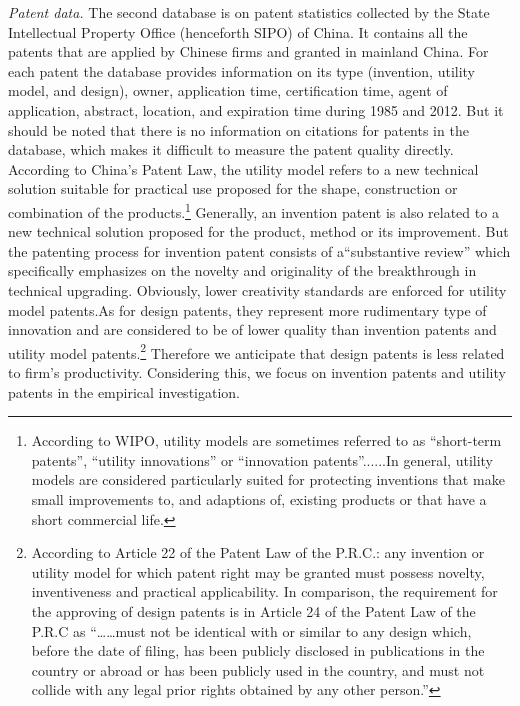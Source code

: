 \documentclass[11pt]{article}
\begin{document}
\textit{Patent data.} The second database is on patent statistics collected by the State Intellectual Property Office (henceforth SIPO) of China. It contains
all the patents that are applied by Chinese firms and granted in mainland China. For each patent the database provides information on its type (invention, utility model, and design), owner, application time, certification time, agent of application, abstract, location, and expiration time during 1985 and 2012. But it should be noted that there is no information on citations for patents in the database,
which makes it difficult to measure the patent quality directly. According to China's Patent Law, the utility model refers to a new technical solution suitable for practical use proposed for the shape, construction or combination of the products.\footnote{According to WIPO, utility models are sometimes referred to as ``short-term patents'', ``utility innovations'' or ``innovation patents''......In general, utility models are considered particularly suited for protecting inventions that make small improvements to, and adaptions of, existing products or that have a short commercial life.}  Generally, an invention patent is also related to a new technical solution proposed for the product, method or its improvement. But the patenting process for invention patent consists of a``substantive review'' which specifically emphasizes on the novelty and originality of the breakthrough in technical upgrading. Obviously, lower creativity standards are enforced for utility model patents.As for design patents, they represent more rudimentary type of innovation and are considered to be of lower quality than invention patents and utility model patents.\footnote{ According to Article 22 of the Patent Law of the P.R.C.: any invention
or utility model for which patent right may be granted must possess
novelty, inventiveness and practical applicability. In comparison,
the requirement for the approving of design patents is in Article
24 of the Patent Law of the P.R.C as \textquotedblleft \dots \dots must
not be identical with or similar to any design which, before the date
of filing, has been publicly disclosed in publications in the country
or abroad or has been publicly used in the country, and must not collide
with any legal prior rights obtained by any other person.\textquotedblright{}}
 Therefore we anticipate that design patents is less related to firm's productivity. Considering this, we focus on invention patents and utility patents in the empirical investigation. 
\end{document}
